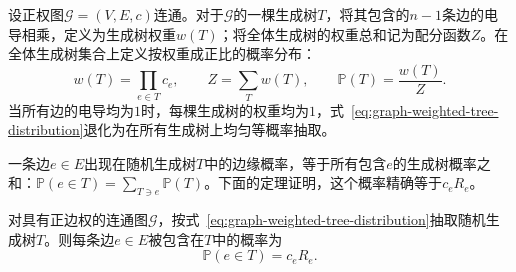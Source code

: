 设正权图$\mathcal G=(V,E,c)$连通。对于$\mathcal G$的一棵生成树$T$，将其包含的$n-1$条边的电导相乘，定义为生成树权重$w(T)$；将全体生成树的权重总和记为配分函数$Z$。在全体生成树集合上定义按权重成正比的概率分布：
\begin{equation}
w(T)=\prod_{e\in T}c_e,
\qquad
Z=\sum_T w(T),
\qquad
\mathbb P(T)=\frac{w(T)}{Z}.
\label{eq:graph-weighted-tree-distribution}
\end{equation}
当所有边的电导均为$1$时，每棵生成树的权重均为$1$，式~\eqref{eq:graph-weighted-tree-distribution}退化为在所有生成树上均匀等概率抽取。

一条边$e\in E$出现在随机生成树$T$中的边缘概率，等于所有包含$e$的生成树概率之和：$\mathbb P(e\in T)=\sum_{T\ni e}\mathbb P(T)$。下面的定理证明，这个概率精确等于$c_e R_e$。

\begin{theorem}[生成树的边包含概率]
\label{thm:graph-tree-edge-probability}
对具有正边权的连通图$\mathcal G$，按式~\eqref{eq:graph-weighted-tree-distribution}抽取随机生成树$T$。则每条边$e\in E$被包含在$T$中的概率为
\begin{equation}
\mathbb P(e\in T)=c_eR_e.
\label{eq:graph-tree-edge-probability}
\end{equation}
\end{theorem}

